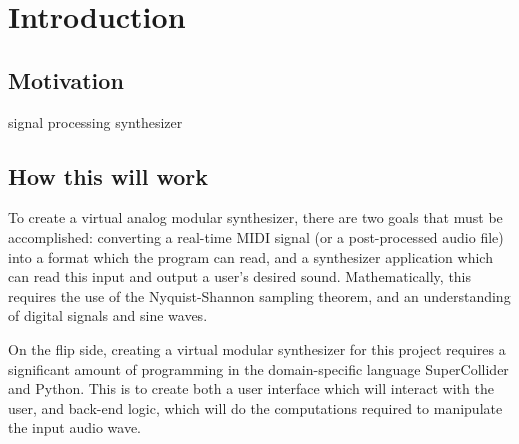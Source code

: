 \chapter{Introduction}\label{chapter:intro}

\section[Motivation]{Motivation}\label{section:motivation}
signal processing
synthesizer



\section[How this will work]{How this will work}\label{section:how-it-works}

To create a virtual analog modular synthesizer, there are two goals that must be accomplished: converting a real-time MIDI signal (or a post-processed audio file) into a format which the program can read, and a synthesizer application which can read this input and output a user's desired sound. Mathematically, this requires the use of the Nyquist-Shannon sampling theorem, and an understanding of digital signals and sine waves. 

On the flip side, creating a virtual modular synthesizer for this project requires a significant amount of programming in the domain-specific language SuperCollider and Python. This is to create both a user interface which will interact with the user, and back-end logic, which will do the computations required to manipulate the input audio wave.